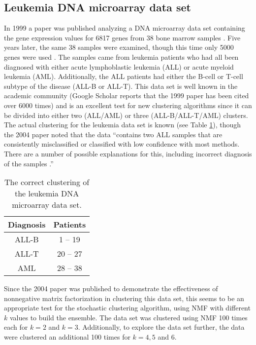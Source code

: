 \documentclass[final]{siamltex}
\begin{document}
\subsection{Leukemia DNA microarray data set} \label{sec:dna}
In 1999 a paper was published analyzing a DNA microarray data set containing the gene expression values for 6817 genes from 38 bone marrow samples \cite{leukemia}. Five years later, the same 38 samples were examined, though this time only 5000 genes were used \cite{metagene}. The samples came from leukemia patients who had all been diagnosed with either acute lymphoblastic leukemia (ALL) or acute myeloid leukemia (AML). Additionally, the ALL patients had either the B-cell or T-cell subtype of the disease (ALL-B or ALL-T). This data set is well known in the academic community (Google Scholar reports that the 1999 paper has been cited over 6000 times) and is an excellent test for new clustering algorithms since it can be divided into either two (ALL/AML) or three (ALL-B/ALL-T/AML) clusters. The actual clustering for the leukemia data set is known (see Table \ref{clusters}), though the 2004 paper noted that the data ``contains two ALL samples that are consistently misclassified or classified with low confidence with most methods.  There are a number of possible explanations for this, including incorrect diagnosis of the samples  \cite{metagene}.''

\begin{table}[ht]
\caption{The correct clustering of the leukemia DNA microarray data set.}
\begin{center}
\begin{tabular}{|c|c|} \hline
 Diagnosis & Patients  \\ \hline
 ALL-B & 1 -- 19  \\
ALL-T  & 20 -- 27  \\
AML &  28 -- 38   \\ \hline
\end{tabular}
\end{center}
\label{clusters}
\end{table}

Since the 2004 paper was published to demonstrate the effectiveness of nonnegative matrix factorization in clustering this data set, this seems to be an appropriate test for the stochastic clustering algorithm, using NMF with different $k$ values to build the ensemble. The data set was clustered using NMF 100 times each for $k=2$ and $k=3$. Additionally, to explore the data set further, the data were clustered an additional 100 times for $k=4,5$ and 6.
\end{document}
